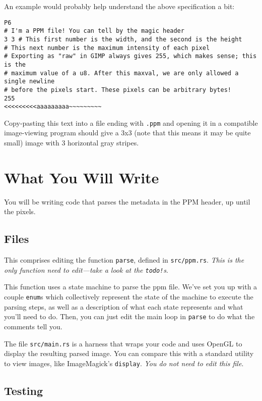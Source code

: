 \documentclass{article}
\begin{document}
An example would probably help understand the above specification a bit:

\begin{verbatim}
P6
# I'm a PPM file! You can tell by the magic header
3 3 # This first number is the width, and the second is the height
# This next number is the maximum intensity of each pixel
# Exporting as "raw" in GIMP always gives 255, which makes sense; this is the
# maximum value of a u8. After this maxval, we are only allowed a single newline
# before the pixels start. These pixels can be arbitrary bytes!
255
<<<<<<<<<aaaaaaaaa~~~~~~~~~
\end{verbatim}

Copy-pasting this text into a file ending with \texttt{.ppm} and opening it in a compatible image-viewing program should give a 3x3 (note that this means it may be quite small) image with 3 horizontal gray stripes.

\section*{What You Will Write}

You will be writing code that parses the metadata in the PPM header, up until the pixels.

\subsection*{Files}

This comprises editing the function \texttt{parse}, defined in \texttt{src/ppm.rs}. \emph{This is the only function need to edit---take a look at the \texttt{todo!}s}.

This function uses a state machine to parse the ppm file. We've set you up with a couple \texttt{enum}s which collectively represent the state of the machine to execute the parsing steps, as well as a description of what each state represents and what you'll need to do. Then, you can just edit the main loop in \texttt{parse} to do what the comments tell you.

The file \texttt{src/main.rs} is a harness that wraps your code and uses OpenGL to display the resulting parsed image. You can compare this with a standard utility to view images, like ImageMagick's \texttt{display}. \emph{You do not need to edit this file}.

\subsection*{Testing}
\end{document}
